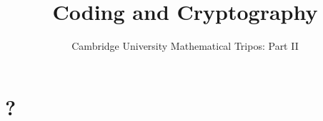 \documentclass{article}
\title{Coding and Cryptography}
\author{Cambridge University Mathematical Tripos: Part II}
\begin{document}
\maketitle

\tableofcontentsnewpage{}

\section{?}
\end{document}
